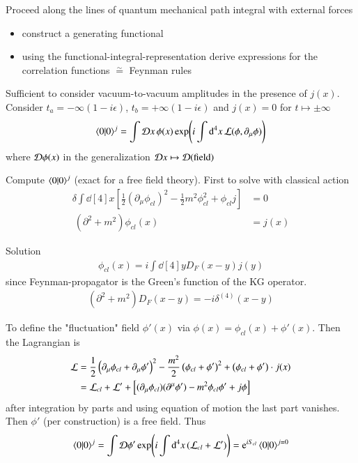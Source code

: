 Proceed along the lines of quantum mechanical path integral with external forces
\begin{itemize}
   \item construct a generating functional
   \item using the functional-integral-representation derive expressions for the correlation functions $\stackrel{\sim}{=}$ Feynman rules
\end{itemize}

Sufficient to consider vacuum-to-vacuum amplitudes in the presence of $j(x)$. Consider $t_a = -\infty(1-i\epsilon)$, $t_b = +\infty(1-i\epsilon)$ and $j(x) = 0$ for $t \mapsto \pm \infty$
\begin{align*}
   \braket{0 | 0}^j = \int \mathcal{D} x \, \phi(x) \exp(i\int \dd[4]{x}\mathcal{L}(\phi, \partial_\mu \phi))
\end{align*}
where $\mathcal{D} \phi(x)$ in the generalization $\mathcal{D} x \mapsto \mathcal{D} (\text{field})$

Compute $\braket{0|0}^j$ (exact for a free field theory). First to solve with classical action
\begin{align*}
   \delta \int \dd[4]{x} \left[ \frac{1}{2} \left( \partial_\mu \phi_{cl} \right)^2 - \frac{1}{2} m^2 \phi^2_{cl} + \phi_{cl}j \right] &= 0\\\
   \left( \partial^2 + m^2 \right) \phi_{cl}(x) &= j(x)
\end{align*}

Solution 
\begin{align}
   \phi_{cl}(x) = i \int \dd[4]{y} D_F(x-y) j(y)
\end{align}
since Feynman-propagator is the Green's function of the KG operator.
\begin{align}
   \left( \partial^2 + m^2 \right) D_F(x-y) = -i \delta^{(4)}(x-y)
\end{align}

To define the "fluctuation" field $\phi'(x)$ via $\phi(x) = \phi_{cl}(x) + \phi'(x)$. Then the Lagrangian is
\begin{align*}
   \mathcal{L} &= \frac{1}{2} \left( \partial_\mu \phi_{cl} + \partial_\mu \phi'\right)^2 -  \frac{m^2}{2} \left( \phi_{cl} + \phi' \right)^2 + \left( \phi_{cl} + \phi' \right) \cdot j(x) \\
        &= \mathcal{L}_{cl} + \mathcal{L}' + \left[ (\partial_\mu \phi_{cl}) (\partial^\mu \phi') - m^2 \phi_{cl} \phi' + j\phi \right] 
\end{align*}
after integration by parts and using equation of motion the last part vanishes. Then $\phi'$ (per construction) is a free field. Thus
\begin{align}
   \braket{0 | 0 }^j = \int \mathcal{D} \phi' \exp(i\int \dd[4]{x} (\mathcal{L}_{cl} + \mathcal{L}'))
   = \mathrm{e}^{iS_{cl}} \braket{0 | 0}^{j=0}
\end{align}

